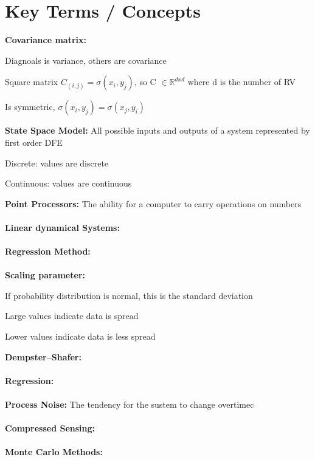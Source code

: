 \documentclass{article}
\begin{document}
\section{Key Terms / Concepts}
\textbf{Covariance matrix: }
\begin{description} [labelindent=1cm]
  \item[$\bullet$] Diagnoals is variance, others are covariance
  \item[$\bullet$] Square matrix $C_{(i,j)} = \sigma(x_i, y_j)$, so C $\in \mathbb{R}^{dxd}$ where d is the number of RV
  \item[$\bullet$] Is symmetric, $\sigma(x_i, y_j) = \sigma(x_j, y_i)$
\end{description}
\textbf{State Space Model:} All possible inputs and outputs of a system represented by first order DFE 
\begin{description} [labelindent=1cm]
    \item[$\bullet$] Discrete: values are discrete
    \item[$\bullet$] Continuous: values are continuous
\end{description}
\textbf{Point Processors:} The ability for a computer to carry operations on numbers \\ \\
\textbf{Linear dynamical Systems:} \\ \\
\textbf{Regression Method:} \\ \\
\textbf{Scaling parameter:} 
\begin{description}[labelindent=1cm]
    \item[$\bullet$] If probability distribution is normal, this is the standard deviation
    \item[$\bullet$] Large values indicate data is spread
    \item[$\bullet$] Lower values indicate data is less spread
\end{description}
\textbf{Dempster–Shafer:} \\ \\
\textbf{Regression:} \\ \\
\textbf{Process Noise:} The tendency for the sustem to change overtimec \\ \\
\textbf{Compressed Sensing:} \\ \\
\textbf{Monte Carlo Methods:} \\ \\
\end{document}
